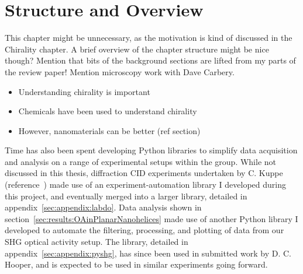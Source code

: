 \chapter{Structure and Overview}\label{sec:background:Introduction}
\color{red}
This chapter might be unnecessary, as the motivation is kind of discussed in the Chirality chapter. A brief overview of the chapter structure might be nice though?
Mention that bits of the background sections are lifted from my parts of the review paper! Mention microscopy work with Dave Carbery.

\begin{itemize}
    \item Understanding chirality is important
    \item Chemicals have been used to understand chirality
    \item However, nanomaterials can be better (ref section)
\end{itemize}
\color{black}

Time has also been spent developing Python libraries to simplify data acquisition and analysis on a range of experimental setups within the group. While not discussed in this thesis, diffraction CID experiments undertaken by C. Kuppe (reference~\cite{Kuppe2018}) made use of an experiment-automation library I developed during this project, and eventually merged into a larger library, detailed in appendix~\ref{sec:appendix:labdo}. Data analysis shown in section~\ref{sec:results:OAinPlanarNanohelices} made use of another Python library I developed to automate the filtering, processing, and plotting of data from our SHG optical activity setup. The library, detailed in appendix~\ref{sec:appendix:pyshg}, has since been used in submitted work by D. C. Hooper, and is expected to be used in similar experiments going forward.